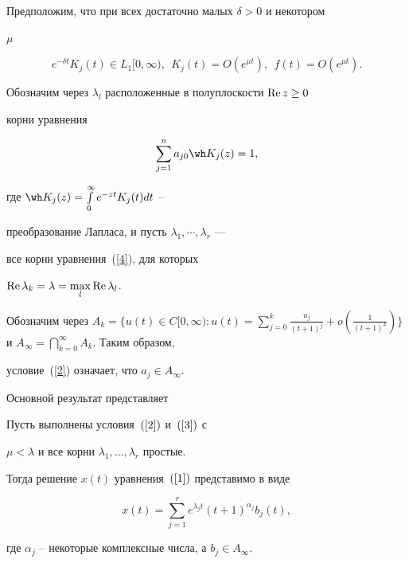 Предположим, что при всех достаточно малых $\delta>0$ и некотором 


$\mu$


\begin{equation}


\label{3}


e^{-\delta t}K_j(t) \in L_1[0,\infty),\ \ K_j(t)=O (e^{\mu t}),


\ \ f(t)=O (e^{\mu t}).


\end{equation}


Обозначим через $\lambda_l$ расположенные в полуплоскости $\operatorname{Re} z\ge 0$ 


корни уравнения


\begin{equation}


\label{4}


\sum\limits_{j=1}^{n} a_{j0} \wh K_j(z)=1,


\end{equation}


где $\wh K_j (z)=\int\limits_0^\infty e^{-zt}K_j (t)dt$ -- 


преобразование Лапласа, и пусть $\lambda_1, \dotsb, \lambda_r$ --- 


все корни уравнения~(\ref{4}), для которых


$\operatorname{Re} \lambda_k=\lambda=\max\limits_l \operatorname{Re} {\lambda_l }$.





Обозначим через $A_k=\Big\{ u(t) \in C[0, \infty): u(t)=


\sum\limits_{j=0}^k \frac {u_j} {(t+1)^j}+o (\frac 1 {(t+1)^k}


) \Big\}$ и $A_{\infty}=\bigcap\limits_{k=0}^{\infty}A_k$. Таким образом,


условие~(\ref{2}) означает, что $a_j \in A_{\infty}$.





Основной результат представляет





\begin{thmnonum}


Пусть выполнены условия~$(\ref{2})$ и~$(\ref{3})$ с 


$\mu <


\lambda$ и все корни $\lambda_1, \dotsc, \lambda_r$ простые.


Тогда решение $x(t)$ уравнения~$(\ref{1})$ представимо в виде


$$


x(t)=\sum\limits_{j=1}^r e^{\lambda_j t} (t+1)^{\alpha_j} b_j(t),


$$


где $\alpha_j$ -- некоторые комплексные числа, а $b_j \in A_{\infty}$.


\end{thmnonum}





